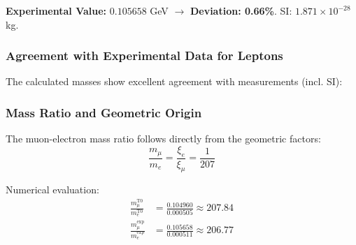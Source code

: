 	\textbf{Experimental Value:} $0.105658$ GeV $\rightarrow$ \textbf{Deviation: 0.66\%}. SI: $1.871 \times 10^{-28}$ kg.
	
	\subsubsection{Agreement with Experimental Data for Leptons}
	
	The calculated masses show excellent agreement with measurements (incl. SI):
	
	\begin{table}[h]
		\centering
		\caption{Comparison of T0 predictions with experimental values for charged leptons (values from \texttt{calc\_De.py})}
		\label{tab:lepton_comparison_direkt}
	\end{table}
	
	\subsubsection{Mass Ratio and Geometric Origin}
	
	The muon-electron mass ratio follows directly from the geometric factors:
	\begin{equation}
		\frac{m_\mu}{m_e} = \frac{\xi_e}{\xi_\mu} = \frac{1}{207}
	\end{equation}
	
	Numerical evaluation:
	\begin{align}
		\frac{m_\mu^{\text{T0}}}{m_e^{\text{T0}}} &= \frac{0.104960}{0.000505} \approx 207.84 \\
		\frac{m_\mu^{\text{exp}}}{m_e^{\text{exp}}} &= \frac{0.105658}{0.000511} \approx 206.77
	\end{align}
	
